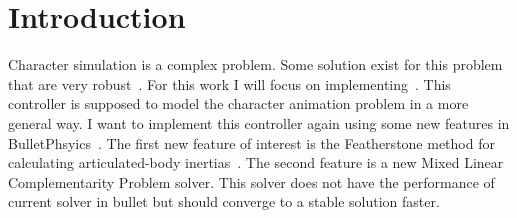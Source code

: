 
\section{Introduction}
\label{sec:Intro}


Character simulation is a complex problem.
Some solution exist for this problem that are very robust~\cite{Yin07,Coros09}.
For this work I will focus on implementing~\cite{2010-TOG-gbwc}.
This controller is supposed to model the character animation problem in a more general way.
I want to implement this controller again using some new features in BulletPhsyics~\cite{coumans2013bullet}.
The first new feature of interest is the Featherstone method for calculating articulated-body inertias~\cite{featherstone2014rigid}. 
The second feature is a new Mixed Linear Complementarity Problem solver. This solver does not have the performance of current solver in bullet but should converge to a stable solution faster.

